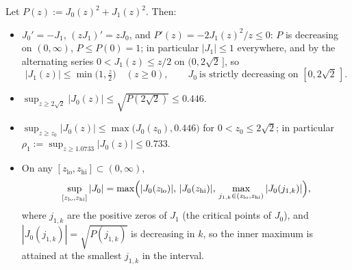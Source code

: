 \begin{lemma}[envelopes of $J_0$]\label{lem:J0env}
Let $P(z):=J_0(z)^2+J_1(z)^2$. Then:
\begin{itemize}
\item[(i)] $J_0'=-J_1$, $(zJ_1)'=zJ_0$, and $P'(z)=-2J_1(z)^2/z\le0$:
$P$ is decreasing on $(0,\infty)$, $P\le P(0)=1$; in particular
$|J_1|\le1$ everywhere, and by the alternating series
$0<J_1(z)\le z/2$ on $(0,2\sqrt2\,]$, so
\[
|J_1(z)|\le\min\bigl(1,\tfrac z2\bigr)\quad(z\ge0),
\qquad
J_0\ \text{is strictly decreasing on }[0,2\sqrt2\,].
\]
\item[(ii)] $\sup_{z\ge2\sqrt2}|J_0(z)|\le\sqrt{P(2\sqrt2)}\le0.446$.
\item[(iii)] $\sup_{z\ge z_0}|J_0(z)|\le\max\bigl(J_0(z_0),0.446\bigr)$
for $0<z_0\le2\sqrt2$; in particular
$\displaystyle\rho_1:=\sup_{z\ge1.0733}|J_0(z)|\le0.733$.
\item[(iv)] On any $[z_{\mathrm{lo}},z_{\mathrm{hi}}]\subset(0,\infty)$,
\[
\sup_{[z_{\mathrm{lo}},z_{\mathrm{hi}}]}|J_0|
=\max\Bigl(|J_0(z_{\mathrm{lo}})|,\,|J_0(z_{\mathrm{hi}})|,\,
\max_{j_{1,k}\in(z_{\mathrm{lo}},z_{\mathrm{hi}})}|J_0(j_{1,k})|\Bigr),
\]
where $j_{1,k}$ are the positive zeros of $J_1$ (the critical points
of $J_0$), and $|J_0(j_{1,k})|=\sqrt{P(j_{1,k})}$ is decreasing in
$k$, so the inner maximum is attained at the smallest $j_{1,k}$ in the
interval.
\end{itemize}
\end{lemma}

